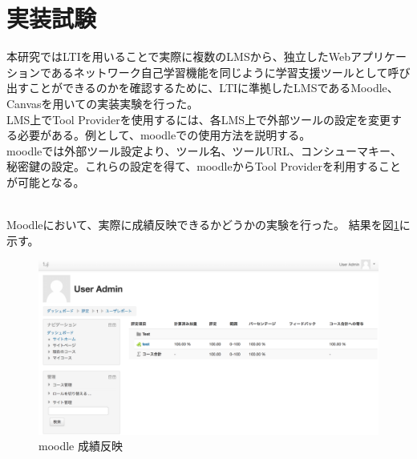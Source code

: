 \section{実装試験}
\label{tag:experiment}
本研究ではLTIを用いることで実際に複数のLMSから、独立したWebアプリケーションであるネットワーク自己学習機能を同じように学習支援ツールとして呼び出すことができるのかを確認するために、LTIに準拠したLMSであるMoodle、Canvasを用いての実装実験を行った。\\

LMS上でTool Providerを使用するには、各LMS上で外部ツールの設定を変更する必要がある。例として、moodleでの使用方法を説明する。\\
moodleでは外部ツール設定より、ツール名、ツールURL、コンシューマキー、秘密鍵の設定。これらの設定を得て、moodleからTool Providerを利用することが可能となる。\\
　

Moodleにおいて、実際に成績反映できるかどうかの実験を行った。
結果を図\ref{fig:moodle score}に示す。
\begin{figure}[htbp]
  \begin{center}
    \includegraphics[scale=0.13]{img/score.png}
    \caption{moodle 成績反映}
    \label{fig:moodle score}
  \end{center}
\end{figure}
